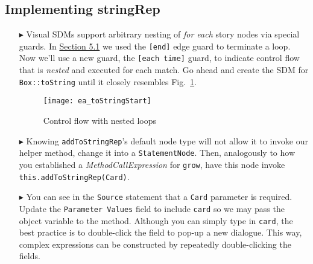 \newpage
\hypertarget{stringRep vis}{}
\subsection{Implementing stringRep}
\visHeader

\begin{itemize}

\item[$\blacktriangleright$] Visual SDMs support arbitrary nesting of \emph{for each} story nodes via special guards. In \hyperlink{emptyPartition vis}{Section
5.1} we used the \texttt{[end]} edge guard to terminate a loop. Now we'll use a new guard, the \texttt{[each time]} guard, to indicate control flow that is \emph{nested} and
executed for each match. Go ahead and create the SDM for \texttt{Box::toString} until it closely resembles Fig.~\ref{fig:sdm_tostring_1}. 

\vspace{0.5cm}

\begin{figure}[htbp]
\begin{center}
  \texttt{[image: ea\_toStringStart]}
  \caption{Control flow with nested loops} 
  \label{fig:sdm_tostring_1}
\end{center}
\end{figure}

\clearpage

\item[$\blacktriangleright$] Knowing \texttt{addToStringRep}'s default node type will not allow it to invoke our helper method, change it
into a \texttt{StatementNode}. Then, analogously to how you established a \emph{MethodCallExpression} for \texttt{grow}, have this node invoke
\texttt{this.addToStringRep(Card)}. 

\vspace{0.5cm}

\item[$\blacktriangleright$] You can see in the \texttt{Source} statement that a \texttt{Card} parameter is required. Update the \texttt{Parameter Values}
field to include \texttt{card} so we may pass the object variable to the method. Although you can simply type in \texttt{card}, the best practice is to
double-click the field to pop-up a new dialogue. This way, complex expressions can be constructed by repeatedly double-clicking the fields.

\vspace{0.5cm}


\end{itemize}
